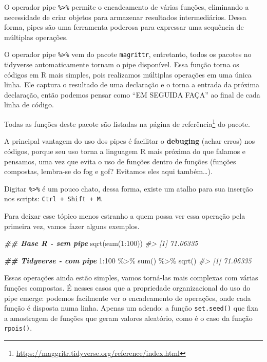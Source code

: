 \documentclass[
]{book}
\newenvironment{Shaded}{\begin{snugshade}}{\end{snugshade}}
\newcommand{\CommentTok}[1]{\textcolor[rgb]{0.37,0.37,0.37}{\textit{#1}}}
\newcommand{\DecValTok}[1]{\textcolor[rgb]{0.06,0.06,0.06}{#1}}
\newcommand{\DocumentationTok}[1]{\textcolor[rgb]{0.37,0.37,0.37}{\textbf{\textit{#1}}}}
\newcommand{\FunctionTok}[1]{\textcolor[rgb]{0,0,0}{#1}}
\newcommand{\NormalTok}[1]{#1}
\newcommand{\SpecialCharTok}[1]{\textcolor[rgb]{0,0,0}{#1}}
\renewcommand{\href}[2]{#2\footnote{\url{#1}}}
\begin{document}
O operador pipe \texttt{\%\textgreater{}\%} permite o encadeamento de várias funções, eliminando a necessidade de criar objetos para armazenar resultados intermediários. Dessa forma, pipes são uma ferramenta poderosa para expressar uma sequência de múltiplas operações.

O operador pipe \texttt{\%\textgreater{}\%} vem do pacote \texttt{magrittr}, entretanto, todos os pacotes no tidyverse automaticamente tornam o pipe disponível. Essa função torna os códigos em R mais simples, pois realizamos múltiplas operações em uma única linha. Ele captura o resultado de uma declaração e o torna a entrada da próxima declaração, então podemos pensar como ``EM SEGUIDA FAÇA'' ao final de cada linha de código.

Todas as funções deste pacote são listadas na \href{https://maggritr.tidyverse.org/reference/index.html}{página de referência} do pacote.

A principal vantagem do uso dos pipes é facilitar o \textbf{debuging} (achar erros) nos códigos, porque seu uso torna a linguagem R mais próxima do que falamos e pensamos, uma vez que evita o uso de funções dentro de funções (funções compostas, lembra-se do fog e gof? Evitamos eles aqui também\ldots).

Digitar \texttt{\%\textgreater{}\%} é um pouco chato, dessa forma, existe um atalho para sua inserção nos scripts: \texttt{Ctrl\ +\ Shift\ +\ M}.

Para deixar esse tópico menos estranho a quem possa ver essa operação pela primeira vez, vamos fazer alguns exemplos.

\begin{Shaded}
\begin{Highlighting}[]
\DocumentationTok{\#\# Base R {-} sem pipe}
\FunctionTok{sqrt}\NormalTok{(}\FunctionTok{sum}\NormalTok{(}\DecValTok{1}\SpecialCharTok{:}\DecValTok{100}\NormalTok{))}
\CommentTok{\#\textgreater{} [1] 71.06335}

\DocumentationTok{\#\# Tidyverse {-} com pipe}
\DecValTok{1}\SpecialCharTok{:}\DecValTok{100} \SpecialCharTok{\%\textgreater{}\%} 
  \FunctionTok{sum}\NormalTok{() }\SpecialCharTok{\%\textgreater{}\%} 
  \FunctionTok{sqrt}\NormalTok{()}
\CommentTok{\#\textgreater{} [1] 71.06335}
\end{Highlighting}
\end{Shaded}

Essas operações ainda estão simples, vamos torná-las mais complexas com várias funções compostas. É nesses casos que a propriedade organizacional do uso do pipe emerge: podemos facilmente ver o encadeamento de operações, onde cada função é disposta numa linha. Apenas um adendo: a função \texttt{set.seed()} que fixa a amostragem de funções que geram valores aleatório, como é o caso da função \texttt{rpois()}.
\end{document}
